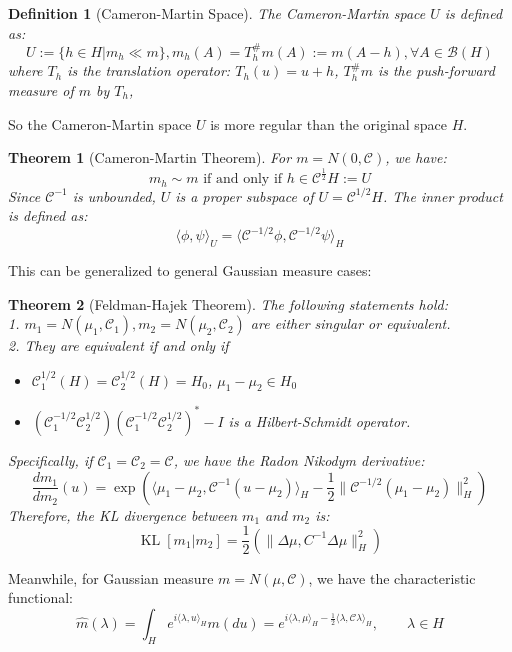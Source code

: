 \documentclass{article}
\newtheorem{theorem}{Theorem}
\newtheorem{definition}{Definition}
\begin{document}
\begin{definition}[Cameron-Martin Space]
The Cameron-Martin space $U$ is defined as:
\begin{equation}
  U:=\{h\in H| m_h\ll m\},m_h(A)=T_h^\#m(A):= m(A-h),\forall A \in \mathcal{B}(H)
\end{equation} 
where $T_h$ is the translation operator: $T_h(u)=u + h$, $T_h^\#m$ is the push-forward measure of $m$ by $T_h$, 
\end{definition}
So the Cameron-Martin space $U$ is more regular than the original space $H$.

\begin{theorem}[Cameron-Martin Theorem]
  For $m=N(0, \mathcal{C})$, we have:
  \begin{equation}
    m_h\sim m \text{ if and only if } h\in \mathcal{C}^\frac{1}{2}H:=U
  \end{equation}
  Since $\mathcal{C}^{-1}$ is unbounded, $U$ is a proper subspace of $U = \mathcal{C}^{1/2}H$.
  The inner product is defined as:
\begin{equation}
  \langle \phi, \psi\rangle_U = \langle \mathcal{C}^{-1/2}\phi, \mathcal{C}^{-1/2}\psi\rangle_H
\end{equation}
\end{theorem}

This can be generalized to general Gaussian measure cases:
\begin{theorem}[Feldman-Hajek Theorem\cite{Prato_Zabczyk_2014}]
  The following statements hold:\\
  1. $m_1 = N(\mu_1, \mathcal{C}_1), m_2 = N(\mu_2, \mathcal{C}_2)$ are either singular or equivalent.\\
  2. They are equivalent if and only if 
  \begin{itemize}
      \item $\mathcal{C}_1^{1/2}(H) = \mathcal{C}_2^{1/2}(H)=H_0$, $\mu_1 - \mu_2 \in H_0$
      \item $(\mathcal{C}_1^{-1/2}\mathcal{C}_2^{1/2})(\mathcal{C}_1^{-1/2}\mathcal{C}_2^{1/2})^*-I$ is a Hilbert-Schmidt operator.
  \end{itemize}
  Specifically, if $\mathcal{C}_1=\mathcal{C}_2=\mathcal{C}$, we have the Radon Nikodym derivative:
  \begin{equation} 
    \frac{dm_1}{dm_2}(u) = \exp{\left(\langle \mu_1 - \mu_2, \mathcal{C}^{-1}(u - \mu_2) \rangle_H - \frac{1}{2}\|\mathcal{C}^{-1/2}(\mu_1 - \mu_2)\|^2_H\right)}
  \end{equation}
  Therefore, the KL divergence between $m_1$ and $m_2$ is:
  \begin{equation}
    \operatorname{KL}[m_1|m_2] = \frac{1}{2}\left(\|\Delta\mu, C^{-1}\Delta \mu\|^2_H\right)
  \end{equation}
\end{theorem}
Meanwhile, for Gaussian measure $m=N(\mu, \mathcal{C})$, we have the characteristic functional:
\begin{equation}
  \hat{m}(\lambda) = \int_H e^{i\langle \lambda, u\rangle_H} m(du) = e^{i\langle \lambda, \mu\rangle_H-\frac{1}{2}\langle \lambda, \mathcal{C}\lambda\rangle_H}, \qquad \lambda\in H
\end{equation}
\end{document}
